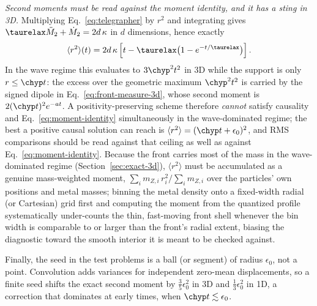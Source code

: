 \emph{Second moments must be read against the moment identity, and it
has a sting in 3D.} Multiplying Eq.~\eqref{eq:telegrapher} by $r^2$ and
integrating gives $\taurelax\ddot M_2+\dot M_2=2d\,\kappa$ in $d$
dimensions, hence exactly
\begin{equation}
  \label{eq:moment-identity}
  \langle r^2\rangle(t)
  = 2d\,\kappa\left[t-\taurelax\big(1-e^{-t/\taurelax}\big)\right] .
\end{equation}
In the wave regime this evaluates to $3\chyp^2t^2$ in 3D while the
support is only $r\le\chyp t$: the excess over the geometric maximum
$\chyp^2t^2$ is carried by the signed dipole in
Eq.~\eqref{eq:front-measure-3d}, whose second moment is
$2(\chyp t)^2e^{-at}$. A positivity-preserving scheme therefore
\emph{cannot} satisfy causality and Eq.~\eqref{eq:moment-identity}
simultaneously in the wave-dominated regime; the best a positive causal
solution can reach is $\langle r^2\rangle=(\chyp t+\epsilon_0)^2$, and
RMS comparisons should be read against that ceiling as well as against
Eq.~\eqref{eq:moment-identity}. Because the front carries most of the mass
in the wave-dominated regime (Section~\ref{sec:exact-3d}), $\langle
r^2\rangle$ must be accumulated as a genuine mass-weighted moment,
$\sum_i m_{Z,i}\,r_i^2/\sum_i m_{Z,i}$ over the particles' own positions
and metal masses; binning the metal density onto a fixed-width radial (or
Cartesian) grid first and computing the moment from the quantized profile
systematically under-counts the thin, fast-moving front shell whenever the
bin width is comparable to or larger than the front's radial extent,
biasing the diagnostic toward the smooth interior it is meant to be
checked against.

Finally, the seed in the test problems is a ball (or segment) of radius
$\epsilon_0$, not a point. Convolution adds variances for independent
zero-mean displacements, so a finite seed shifts the exact second moment
by $\tfrac35\epsilon_0^2$ in 3D and $\tfrac13\epsilon_0^2$ in 1D,
a correction that dominates at early times, when $\chyp t\lesssim\epsilon_0$.
